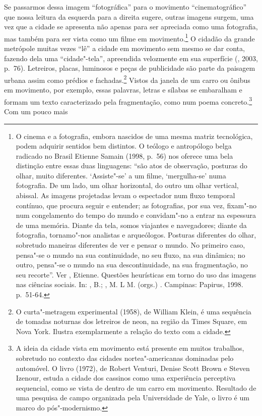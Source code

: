 Se passarmos dessa imagem ``fotográfica'' para o movimento
``cinematográfico'' que nossa leitura da esquerda para a direita sugere,
outras imagens surgem, uma vez que a cidade se apresenta não apenas para
ser apreciada como uma fotografia, mas também para ser vista como um filme em movimento.\footnote{O cinema e a fotografia, embora nascidos de uma mesma matriz tecnológica, podem adquirir sentidos bem distintos. O teólogo e antropólogo belga radicado no Brasil Etienne Samain (1998, p.~56) nos oferece uma bela distinção entre essas duas linguagens: ``são atos de observação, posturas do olhar, muito diferentes. `Assiste"-se' a um filme, `mergulha-se' numa fotografia. De um lado, um olhar horizontal, do outro um olhar vertical, abissal. As imagens projetadas levam o espectador num fluxo temporal contínuo, que procura seguir e entender; as fotografias, por sua vez, fixam"-no num congelamento do tempo do mundo e convidam"-no a entrar na espessura de uma memória. Diante da tela, somos viajantes e navegadores; diante da fotografia, tornamo"-nos analistas e arqueólogos. Posturas diferentes do olhar, sobretudo maneiras diferentes de ver e pensar o mundo. No primeiro caso, pensa"-se o mundo na sua continuidade, no seu fluxo, na sua dinâmica; no outro, pensa"-se o mundo na sua descontinuidade, na sua fragmentação, no seu recorte''. Ver , Etienne. Questões heurísticas em torno do uso das imagens nas ciências sociais. In: , B.; , M. L M. (orgs.) {}. Campinas: Papirus, 1998. p.~51-64.} O cidadão da grande metrópole
muitas vezes ``lê'' a cidade em movimento sem mesmo se dar conta,
fazendo dela uma ``cidade"-tela'', apreendida velozmente em sua
superfície (, 2003, p.~76). Letreiros, placas, luminosos e peças
de publicidade são parte da paisagem urbana assim como prédios e
fachadas.\footnote{O curta"-metragem experimental {} (1958), de William Klein, é uma sequência de tomadas noturnas
  dos letreiros de neon, na região da Times Square, em Nova York.
  Ilustra exemplarmente a relação do texto com a cidade.} Vistos da janela de um carro ou ônibus em movimento, por
exemplo, essas palavras, letras e sílabas se embaralham e formam um
texto caracterizado pela fragmentação, como num poema
concreto.\footnote{A ideia da cidade vista em movimento está presente em muitos trabalhos, sobretudo no contexto das cidades nortea"-americanas dominadas pelo automóvel. O livro {} (1972), de Robert Venturi, Denise Scott Brown e Steven Izenour, estuda a cidade dos cassinos como uma experiência perceptiva sequencial, como se vista de dentro de um carro em movimento. Resultado de uma pesquisa de campo organizada pela Universidade de Yale, o livro é um marco do pós"-modernismo.} Com um pouco mais
